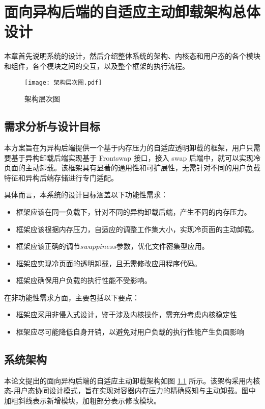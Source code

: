 \chapter{面向异构后端的自适应主动卸载架构总体设计}

本章首先说明系统的设计，然后介绍整体系统的架构、内核态和用户态的各个模块和组件，各个模块之间的交互，以及整个框架的执行流程。

\begin{figure}[htb]
    \centering
    \texttt{[image: 架构层次图.pdf]}
    \caption{架构层次图}
    \label{fig:system_architecture_hierarchy}
\end{figure}

\section{需求分析与设计目标}

本方案旨在为异构后端提供一个基于内存压力的自适应透明卸载的框架，用户只需要基于异构卸载后端实现基于 Frontswap 接口，接入 swap 后端中，就可以实现冷页面的主动卸载。该框架具有显著的通用性和可扩展性，无需针对不同的用户负载特征和异构后端存储进行专门适配。


具体而言，本系统的设计目标涵盖以下功能性需求：
\begin{itemize}
\item 框架应该在同一负载下，针对不同的异构卸载后端，产生不同的内存压力。
\item 框架应该根据内存压力，自适应的调整工作集大小，实现冷页面的主动卸载。
\item 框架应该正确的调节\(swappiness\)参数，优化文件密集型应用。
\item 框架应实现冷页面的透明卸载，且无需修改应用程序代码。
\item 框架应确保用户负载的执行性能不受影响。
\end{itemize}

在非功能性需求方面，主要包括以下要点：
\begin{itemize}
\item 框架应采用非侵入式设计，鉴于涉及内核操作，需充分考虑内核稳定性
\item 框架应尽可能降低自身开销，以避免对用户负载的执行性能产生负面影响
\end{itemize}

\section{系统架构}
本论文提出的面向异构后端的自适应主动卸载架构如图 \ref{fig:system_architecture_hierarchy} 所示。该架构采用内核态-用户态协同设计模式，旨在实现对容器内存压力的精确感知与主动卸载。图中加粗斜线表示新增模块，加粗部分表示修改模块。

